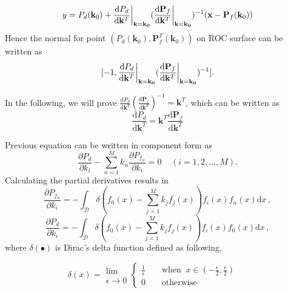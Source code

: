 \documentclass[12pt,journal,a4paper,twoside,onecolumn]{IEEEtran}
\begin{document}
\begin{spacing}{2.5}
\begin{equation}
\label{pro : y2}
y = P_d(\mathbf{k}_0) + \frac{\mathrm{d}P_d}{\mathrm{d}\mathbf{k}^T}\bigg{|}_{\mathbf{k}=\mathbf{k_0}}(
\frac{\mathrm{d}\mathbf{P}_f}{\mathrm{d}\mathbf{k}^T}\bigg{|}_{\mathbf{k}=\mathbf{k_0}}
)^{-1} (\mathbf{x} - \mathbf{P}_f(\mathbf{k}_0))
\end{equation}
Hence the normal for point $(P_d(\mathbf{k}_0), \mathbf{P}_f^T(\mathbf{k}_0))$ on ROC surface can be written as
\begin{equation}
\label{vec: normal}
[-1, \frac{\mathrm{d}P_d}{\mathrm{d}\mathbf{k}^T}\bigg{|}_{\mathbf{k}=\mathbf{k_0}}(
\frac{\mathrm{d}\mathbf{P}_f}{\mathrm{d}\mathbf{k}^T}\bigg{|}_{\mathbf{k}=\mathbf{k_0}}
)^{-1}
].
\end{equation}

In the following, we will prove $ \frac{\mathrm{d}P_d}{\mathrm{d}\mathbf{k}^T}(
\frac{\mathrm{d}\mathbf{P}_f}{\mathrm{d}\mathbf{k}^T}
)^{-1} = \mathbf{k}^T
$, which can be written as
\begin{equation}
\label{pro: vec}
\frac{\mathrm{d}P_d}{\mathrm{d}\mathbf{k}^T} = \mathbf{k}^T \frac{\mathrm{d}\mathbf{P}_f}{\mathrm{d}\mathbf{k}^T}
\end{equation}

Previous equation can be written in component form as
\begin{equation}
\label{pro: component}
\frac{\partial P_d}{\partial k_i} - \sum_{n=1}^{M}k_n\frac{\partial P_{f_n}}{\partial k_i} = 0 \;\;\;\;(i=1, 2, ..., M).
\end{equation}
Calculating the  partial derivatives results in
\begin{equation}
\label{pro: Pf par k}
\frac{\partial P_{f_n}}{ \partial k_i} = - \int_{\mathcal{D}}\delta (f_0(x) - \sum_{j=1}^{M}k_jf_j(x))f_i(x)f_n(x) \mathrm{d}x\,,
\end{equation}
\label{pro: Pd par k}
\begin{equation}\frac{\partial P_d}{ \partial k_i} = - \int_{\mathcal{D}}\delta (f_0(x) - \sum_{j=1}^{M}k_jf_j(x))f_i(x)f_0(x) \mathrm{d}x\,,
\end{equation}
where $\delta(\bullet)$ is Dirac's delta function defined as following,

\begin{equation}
\label{pro: delta}
\delta(x) = \substack{\lim \\ \epsilon \rightarrow 0} \begin{cases}
\frac{1}{\epsilon}\;\;\;\;&\text{when} \;\;x \in (-\frac{\epsilon}{2}, \frac{\epsilon}{2})\\
0\;\;\;\;&\text{otherwise}
\end{cases} \;\;\;\;
\end{equation}


\end{spacing}
\end{document}

